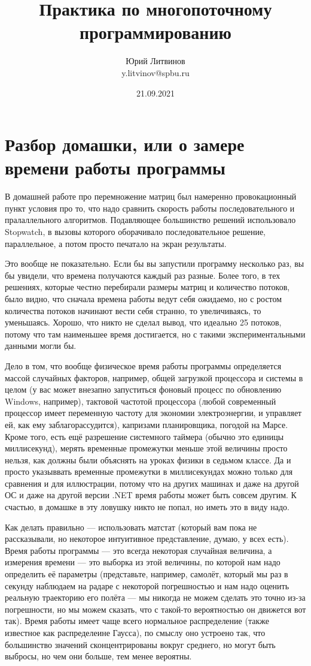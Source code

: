 \documentclass[a5paper]{article}
\title{Практика по многопоточному программированию}
\author{Юрий Литвинов\\\small{y.litvinov@spbu.ru}}
\date{21.09.2021}
\begin{document}
\maketitle
\thispagestyle{empty}

\section{Разбор домашки, или о замере времени работы программы}

В домашней работе про перемножение матриц был намеренно провокационный пункт условия про то, что надо сравнить скорость работы последовательного и пралаллельного алгоритмов. Подавляющее большинство решений использовало Stopwatch, в вызовы которого оборачивало последовательное решение, параллельное, а потом просто печатало на экран результаты.

Это вообще не показательно. Если бы вы запустили программу несколько раз, вы бы увидели, что времена получаются каждый раз разные. Более того, в тех решениях, которые честно перебирали размеры матриц и количество потоков, было видно, что сначала времена работы ведут себя ожидаемо, но с ростом количества потоков начинают вести себя странно, то увеличиваясь, то уменьшаясь. Хорошо, что никто не сделал вывод, что идеально 25 потоков, потому что там наименьшее время достигается, но с такими экспериментальными данными могли бы.

Дело в том, что вообще физическое время работы программы определяется массой случайных факторов, например, общей загрузкой процессора и системы в целом (у вас может внезапно запуститься фоновый процесс по обновлению Windows, например), тактовой частотой процессора (любой современный процессор имеет переменную частоту для экономии электроэнергии, и управляет ей, как ему заблагорассудится), капризами планировщика, погодой на Марсе. Кроме того, есть ещё разрешение системного таймера (обычно это единицы миллисекунд), мерять временные промежутки меньше этой величины просто нельзя, как должны были объяснять на уроках физики в седьмом классе. Да и просто указыввать временные промежутки в миллисекундах можно только для сравнения и для иллюстрации, потому что на других машинах и даже на другой ОС и даже на другой версии .NET время работы может быть совсем другим. К счастью, в домашке в эту ловушку никто не попал, но иметь это в виду надо.

Как делать правильно --- использовать матстат (который вам пока не рассказывали, но некоторое интуитивное представление, думаю, у всех есть). Время работы программы --- это всегда некоторая случайная величина, а измерения времени --- это выборка из этой величины, по которой нам надо определить её параметры (представьте, например, самолёт, который мы раз в секунду наблюдаем на радаре с некоторой погрешностью и нам надо оценить реальную траекторию его полёта --- мы никогда не можем сделать это точно из-за погрешности, но мы можем сказать, что с такой-то вероятностью он движется вот так). Время работы имеет чаще всего нормальное распределение (также известное как распределеине Гаусса), по смыслу оно устроено так, что большинство значений сконцентрированы вокруг среднего, но могут быть выбросы, но чем они больше, тем менее вероятны. 
\end{document}
